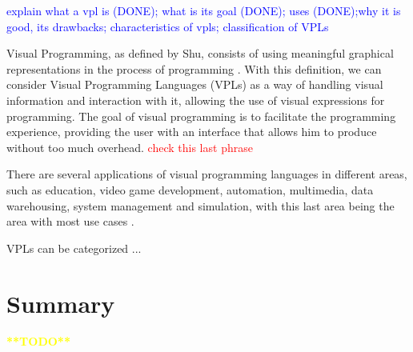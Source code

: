 \textcolor{blue}{explain what a vpl is (DONE); what is its goal (DONE); uses (DONE);why it is good, its drawbacks; characteristics of vpls; classification of VPLs}

Visual Programming, as defined by Shu, consists of using meaningful graphical representations in the process of programming \cite{vpl_definition_shu}. With this definition, we can consider Visual Programming Languages (VPLs) as a way of handling visual information and interaction with it, allowing the use of visual expressions for programming. The goal of visual programming is to facilitate the programming experience, providing the user with an interface that allows him to produce without too much overhead. \textcolor{red}{check this last phrase}
\par There are several applications of visual programming languages in different areas, such as education, video game development, automation, multimedia, data warehousing, system management and simulation, with this last area being the area with most use cases \cite{survey_vpl_iot}.
\par VPLs can be categorized ...
 \cite{vpl-book}

\section{Summary}

\textcolor{yellow}{\textbf{**TODO**}}
